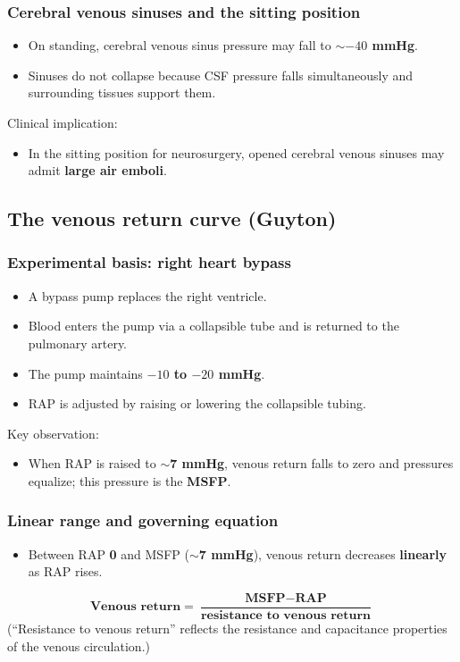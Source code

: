 \documentclass[11pt,a4paper]{article}
\begin{document}
\subsubsection{Cerebral venous sinuses and the sitting position}
\begin{itemize}
\item On standing, cerebral venous sinus pressure may fall to \textbf{$\sim-40$ mmHg}.
\item Sinuses do not collapse because CSF pressure falls simultaneously and surrounding tissues support them.
\end{itemize}
Clinical implication:
\begin{itemize}
\item In the sitting position for neurosurgery, opened cerebral venous sinuses may admit \textbf{large air emboli}.
\end{itemize}

\subsection{The venous return curve (Guyton)}

\subsubsection{Experimental basis: right heart bypass}
\begin{itemize}
\item A bypass pump replaces the right ventricle.
\item Blood enters the pump via a collapsible tube and is returned to the pulmonary artery.
\item The pump maintains \textbf{$-10$ to $-20$ mmHg}.
\item RAP is adjusted by raising or lowering the collapsible tubing.
\end{itemize}
Key observation:
\begin{itemize}
\item When RAP is raised to \textbf{$\sim$7 mmHg}, venous return falls to zero and pressures equalize; this pressure is the \textbf{MSFP}.
\end{itemize}

\subsubsection{Linear range and governing equation}
\begin{itemize}
\item Between RAP \textbf{0} and MSFP (\textbf{$\sim$7 mmHg}), venous return decreases \textbf{linearly} as RAP rises.
\end{itemize}
\[
\textbf{Venous return} = \frac{\textbf{MSFP} - \textbf{RAP}}{\textbf{resistance to venous return}}
\]
(“Resistance to venous return” reflects the resistance and capacitance properties of the venous circulation.)
\end{document}
